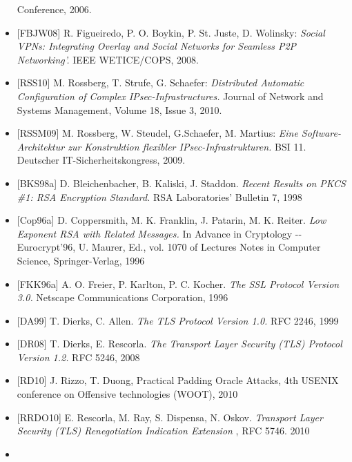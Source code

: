 \documentclass[a4paper]{article}
\begin{document}
\begin{multicols}{3}
\begin{itemize}
              Conference, 2006.
        \item
              {[}FBJW08{]} R. Figueiredo, P. O. Boykin, P. St. Juste, D. Wolinsky:
              \emph{Social VPNs: Integrating Overlay and Social Networks for
                  Seamless P2P Networking'.} IEEE WETICE/COPS, 2008.
        \item
              {[}RSS10{]} M. Rossberg, T. Strufe, G. Schaefer: \emph{Distributed
                  Automatic Configuration of Complex IPsec-Infrastructures.} Journal of
              Network and Systems Management, Volume 18, Issue 3, 2010.
        \item
              {[}RSSM09{]} M. Rossberg, W. Steudel, G.Schaefer, M. Martius:
              \emph{Eine Software-Architektur zur Konstruktion flexibler
                  IPsec-Infrastrukturen.} BSI 11. Deutscher IT-Sicherheitskongress,
              2009.
        \item
              {[}BKS98a{]} D. Bleichenbacher, B. Kaliski, J. Staddon. \emph{Recent
                  Results on PKCS \#1: RSA Encryption Standard.} RSA Laboratories'
              Bulletin 7, 1998
        \item
              {[}Cop96a{]} D. Coppersmith, M. K. Franklin, J. Patarin, M. K. Reiter.
              \emph{Low Exponent RSA with Related Messages.} In Advance in
              Cryptology -\/- Eurocrypt'96, U. Maurer, Ed., vol. 1070 of Lectures
              Notes in Computer Science, Springer-Verlag, 1996
        \item
              {[}FKK96a{]} A. O. Freier, P. Karlton, P. C. Kocher. \emph{The SSL
                  Protocol Version 3.0.} Netscape Communications Corporation, 1996
        \item
              {[}DA99{]} T. Dierks, C. Allen. \emph{The TLS Protocol Version 1.0.}
              RFC 2246, 1999
        \item
              {[}DR08{]} T. Dierks, E. Rescorla. \emph{The Transport Layer Security
                  (TLS) Protocol Version 1.2.} RFC 5246, 2008
        \item
              {[}RD10{]} J. Rizzo, T. Duong, Practical Padding Oracle Attacks, 4th
              USENIX conference on Offensive technologies (WOOT), 2010
        \item
              {[}RRDO10{]} E. Rescorla, M. Ray, S. Dispensa, N. Oskov.
              \emph{Transport Layer Security (TLS) Renegotiation Indication
                  Extension} , RFC 5746. 2010
        \item

\end{itemize}
\end{multicols}
\end{document}
